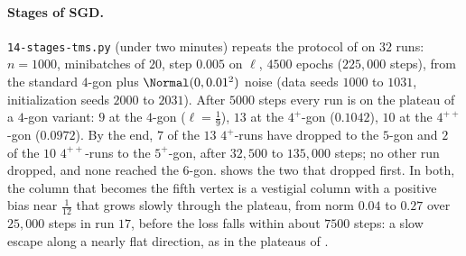 \begin{refsection}
\paragraph{Stages of SGD.} \texttt{14-stages-tms.py} (under two minutes) repeats the protocol of \textcite{ChenEtAl2023} on $32$ runs: $n=1000$, minibatches of $20$, step $0.005$ on $\ell$, $4500$ epochs ($225{,}000$ steps), from the standard $4$-gon plus $\Normal(0,0.01^2)$ noise (data seeds $1000$ to $1031$, initialization seeds $2000$ to $2031$). After $5000$ steps every run is on the plateau of a $4$-gon variant: $9$ at the $4$-gon ($\ell=\frac19$), $13$ at the $4^+$-gon ($0.1042$), $10$ at the $4^{++}$-gon ($0.0972$). By the end, $7$ of the $13$ $4^+$-runs have dropped to the $5$-gon and $2$ of the $10$ $4^{++}$-runs to the $5^+$-gon, after $32{,}500$ to $135{,}000$ steps; no other run dropped, and none reached the $6$-gon.  shows the two that dropped first. In both, the column that becomes the fifth vertex is a vestigial column with a positive bias near $\frac1{12}$ that grows slowly through the plateau, from norm $0.04$ to $0.27$ over $25{,}000$ steps in run $17$, before the loss falls within about $7500$ steps: a slow escape along a nearly flat direction, as in the plateaus of \textcite{FukumizuAmari2000}.


\end{refsection}
